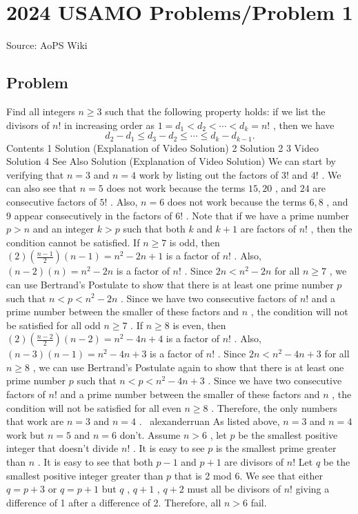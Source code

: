 \documentclass[12pt]{article}
\begin{document}
\section*{{2024 USAMO Problems/Problem 1}}
Source: AoPS Wiki

\subsection*{Problem}
Find all integers $n \geq 3$ such that the following property holds: if we list the divisors of $n !$ in increasing order as $1=d_1<d_2<\cdots<d_k=n!$ , then we have \[d_2-d_1 \leq d_3-d_2 \leq \cdots \leq d_k-d_{k-1} .\] Contents 1 Solution (Explanation of Video Solution) 2 Solution 2 3 Video Solution 4 See Also Solution (Explanation of Video Solution) We can start by verifying that $n=3$ and $n=4$ work by listing out the factors of $3!$ and $4!$ . We can also see that $n=5$ does not work because the terms $15, 20$ , and $24$ are consecutive factors of $5!$ . Also, $n=6$ does not work because the terms $6, 8$ , and $9$ appear consecutively in the factors of $6!$ . Note that if we have a prime number $p>n$ and an integer $k>p$ such that both $k$ and $k+1$ are factors of $n!$ , then the condition cannot be satisfied. If $n\geq7$ is odd, then $(2)(\frac{n-1}{2})(n-1)=n^2-2n+1$ is a factor of $n!$ . Also, $(n-2)(n)=n^2-2n$ is a factor of $n!$ . Since $2n<n^2-2n$ for all $n\geq7$ , we can use Bertrand's Postulate to show that there is at least one prime number $p$ such that $n<p<n^2-2n$ . Since we have two consecutive factors of $n!$ and a prime number between the smaller of these factors and $n$ , the condition will not be satisfied for all odd $n\geq7$ . If $n\geq8$ is even, then $(2)(\frac{n-2}{2})(n-2)=n^2-4n+4$ is a factor of $n!$ . Also, $(n-3)(n-1)=n^2-4n+3$ is a factor of $n!$ . Since $2n<n^2-4n+3$ for all $n\geq8$ , we can use Bertrand's Postulate again to show that there is at least one prime number $p$ such that $n<p<n^2-4n+3$ . Since we have two consecutive factors of $n!$ and a prime number between the smaller of these factors and $n$ , the condition will not be satisfied for all even $n\geq8$ . Therefore, the only numbers that work are $n=3$ and $n=4$ . ~alexanderruan As listed above, $n=3$ and $n=4$ work but $n=5$ and $n=6$ don't. Assume $n>6$ , let $p$ be the smallest positive integer that doesn't divide $n!$ . It is easy to see $p$ is the smallest prime greater than $n$ . It is easy to see that both $p-1$ and $p+1$ are divisors of $n!$ Let $q$ be the smallest positive integer greater than $p$ that is 2 mod 6. We see that either $q=p+3$ or $q=p+1$ but $q$ , $q+1$ , $q+2$ must all be divisors of $n!$ giving a difference of 1 after a difference of 2. Therefore, all $n>6$ fail.
\end{document}
